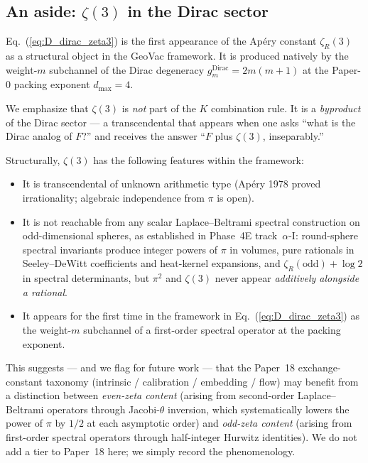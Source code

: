\subsection{An aside: $\zeta(3)$ in the Dirac sector}\label{sec:zeta3_aside}

Eq.~(\ref{eq:D_dirac_zeta3}) is the first appearance of the Apéry
constant $\zeta_R(3)$ as a structural object in the GeoVac framework.
It is produced natively by the weight-$m$ subchannel of the Dirac
degeneracy $g_{m}^{\text{Dirac}} = 2m(m+1)$ at the Paper-0 packing
exponent $d_{\max} = 4$.

We emphasize that $\zeta(3)$ is \emph{not} part of the $K$ combination
rule. It is a \emph{byproduct} of the Dirac sector — a transcendental
that appears when one asks ``what is the Dirac analog of $F$?'' and
receives the answer ``$F$ plus $\zeta(3)$, inseparably.''

Structurally, $\zeta(3)$ has the following features within the
framework:

\begin{itemize}
  \item It is transcendental of unknown arithmetic type (Apéry 1978
    proved irrationality; algebraic independence from $\pi$ is open).
  \item It is not reachable from any scalar Laplace--Beltrami spectral
    construction on odd-dimensional spheres, as established in Phase~4E
    track~$\alpha$-I: round-sphere spectral invariants produce
    integer powers of $\pi$ in volumes, pure rationals in Seeley--DeWitt
    coefficients and heat-kernel expansions, and $\zeta_{R}(\text{odd})
    + \log 2$ in spectral determinants, but $\pi^{2}$ and $\zeta(3)$
    never appear \emph{additively alongside a rational}.
  \item It appears for the first time in the framework in
    Eq.~(\ref{eq:D_dirac_zeta3}) as the weight-$m$ subchannel of a
    first-order spectral operator at the packing exponent.
\end{itemize}

This suggests — and we flag for future work — that the Paper~18
exchange-constant taxonomy (intrinsic / calibration / embedding / flow)
may benefit from a distinction between \emph{even-zeta content} (arising
from second-order Laplace--Beltrami operators through Jacobi-$\theta$
inversion, which systematically lowers the power of $\pi$ by $1/2$ at
each asymptotic order) and \emph{odd-zeta content} (arising from
first-order spectral operators through half-integer Hurwitz
identities). We do not add a tier to Paper~18 here; we simply record
the phenomenology.

